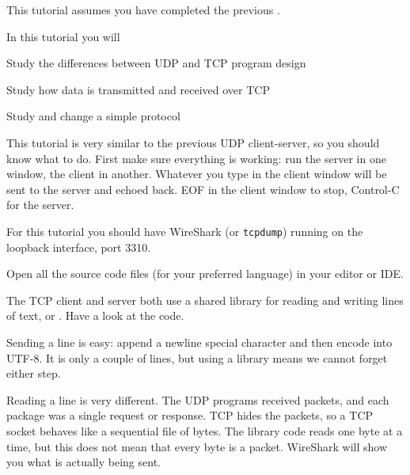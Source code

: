 







\begin{itshape}
This tutorial assumes you have completed the previous .
\end{itshape}



In this tutorial you will

\DOT Study the differences between UDP and TCP program design

\DOT Study how data is transmitted and received over TCP

\DOT Study and change a simple protocol


This tutorial is very similar to the previous UDP client-server, so you should
know what to do. First make sure everything is
working: run the server in one window, the client in another. Whatever
you type in the client window will be sent to the server and echoed back. EOF
in the client window to stop, Control-C for the server.

For this tutorial you should have WireShark (or \texttt{tcpdump}) running
on the loopback interface, port 3310.



Open all the source code files (for your preferred language) in your editor
or IDE.

The TCP client and server both use a shared library for reading and writing
lines of text,  or . Have a look at the
code.

Sending a line is easy: append a newline special character and then encode
into UTF-8. It is only a couple of lines, but using a library means we cannot
forget either step.

Reading a line is very different. The UDP programs received packets, and each
package was a single request or response. TCP hides the packets, so a TCP
socket behaves like a sequential file of bytes. The library code reads one
byte at a time, but this does not mean that every byte is a packet. WireShark
will show you what is actually being sent.

